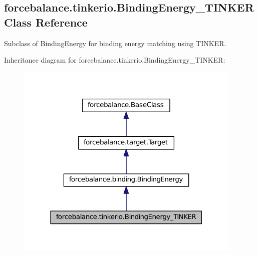 \hypertarget{classforcebalance_1_1tinkerio_1_1BindingEnergy__TINKER}{\subsection{forcebalance.\-tinkerio.\-Binding\-Energy\-\_\-\-T\-I\-N\-K\-E\-R \-Class \-Reference}
\label{classforcebalance_1_1tinkerio_1_1BindingEnergy__TINKER}
}


\-Subclass of \-Binding\-Energy for binding energy matching using \-T\-I\-N\-K\-E\-R.  




\-Inheritance diagram for forcebalance.\-tinkerio.\-Binding\-Energy\-\_\-\-T\-I\-N\-K\-E\-R\-:\nopagebreak
\begin{figure}[H]
\begin{center}
\leavevmode
\includegraphics[width=306pt]{classforcebalance_1_1tinkerio_1_1BindingEnergy__TINKER__inherit__graph}
\end{center}
\end{figure}


